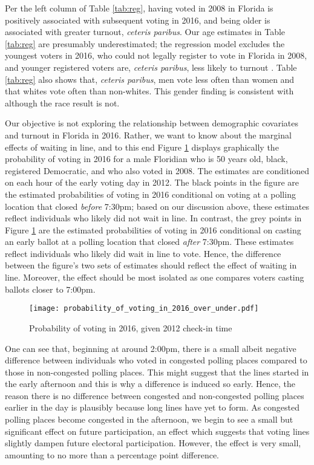 \documentclass[12pt,titlepage]{article}
\begin{document}
Per the left column of Table \ref{tab:reg}, having voted in 2008 in
Florida is positively associated with subsequent voting in 2016, and
being older is associated with greater turnout, \emph{ceteris
  paribus}.  Our age estimates in Table \ref{tab:reg} are presumably
underestimated; the regression model excludes the youngest voters in
2016, who could not legally register to vote in Florida in 2008, and
younger registered voters are, \emph{ceteris paribus}, less likely to
turnout \citep{shinosmith:registrationtiming}.  Table \ref{tab:reg}
also shows that, \emph{ceteris paribus}, men vote less often than
women and that whites vote often than non-whites.  This gender finding
is consistent with \citet{leighleynagler:whovotesnow} although the
race result is not.

Our objective is not exploring the relationship between demographic
covariates and turnout in Florida in 2016.  Rather, we want to know
about the marginal effects of waiting in line, and to this end Figure
\ref{fig:prvoting2016} displays graphically the probability of voting
in 2016 for a male Floridian who is 50 years old, black, registered
Democratic, and who also voted in 2008.  The estimates are conditioned
on each hour of the early voting day in 2012. The black points in the
figure are the estimated probabilities of voting in 2016 conditional
on voting at a polling location that closed \emph{before} 7:30pm;
based on our discussion above, these estimates reflect individuals who
likely did not wait in line.  In contrast, the grey points in Figure
\ref{fig:prvoting2016} are the estimated probabilities of voting in
2016 conditional on casting an early ballot at a polling location that
closed \emph{after} 7:30pm.  These estimates reflect individuals who
likely did wait in line to vote.  Hence, the difference between the
figure's two sets of estimates should reflect the effect of waiting in
line.  Moreover, the effect should be most isolated as one compares
voters casting ballots closer to 7:00pm.

\begin{figure}[!ht]
\caption{Probability of voting in 2016, given 2012 check-in time}
  \label{fig:prvoting2016}
  \centering
    \centering\texttt{[image: probability\_of\_voting\_in\_2016\_over\_under.pdf]}
\end{figure}

One can see that, beginning at around 2:00pm, there is a small albeit
negative difference between individuals who voted in congested polling
places compared to those in non-congested polling places.  This might
suggest that the lines started in the early afternoon and this is why
a difference is induced so early.  Hence, the reason there is no
difference between congested and non-congested polling places earlier
in the day is plausibly because long lines have yet to form. As
congested polling places become congested in the afternoon, we begin
to see a small but significant effect on future participation, an
effect which suggests that voting lines slightly dampen future
electoral participation.  However, the effect is very small, amounting
to no more than a percentage point difference.
\end{document}
